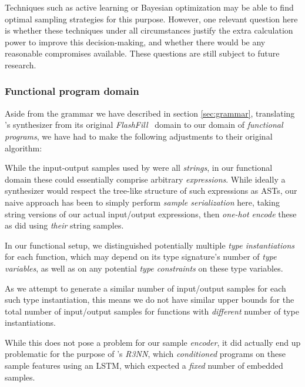 \documentclass{article}
\begin{document}
Techniques such as active learning or Bayesian optimization may be able to find optimal sampling strategies for this purpose.
However, one relevant question here is whether these techniques under all circumstances justify the extra calculation power to improve this decision-making,
and whether there would be any reasonable compromises available.
These questions are still subject to future research.


\subsubsection{Functional program domain} \label{sec:fp}

Aside from the grammar we have described in section \ref{sec:grammar},
translating \citet{nsps}'s synthesizer from its original \emph{FlashFill}~\citep{prose} domain to our domain of \emph{functional programs},
we have had to make the following adjustments to their original algorithm:

    While the input-output samples used by \citet{nsps} were all \emph{strings},
    in our functional domain these could essentially comprise arbitrary \emph{expressions}.
    While ideally a synthesizer would respect the tree-like structure of such expressions as ASTs,
    our naive approach has been to simply perform \emph{sample serialization} here,
    taking string versions of our actual input/output expressions,
    then \emph{one-hot encode} these as \citet{nsps} did using \emph{their} string samples.

    In our functional setup,
    we distinguished potentially multiple \emph{type instantiations} for each function,
    which may depend on its type signature's number of \emph{type variables},
    as well as on any potential \emph{type constraints} on these type variables.

    As we attempt to generate a similar number of input/output samples for each such type instantiation,
    this means we do not have similar upper bounds for the total number of input/output samples for functions with \emph{different} number of type instantiations.

    While this does not pose a problem for our sample \emph{encoder},
    it did actually end up problematic for the purpose of \citet{nsps}'s \emph{R3NN},
    which \emph{conditioned} programs on these sample features using an LSTM,
    which expected a \emph{fixed} number of embedded samples.
\end{document}
